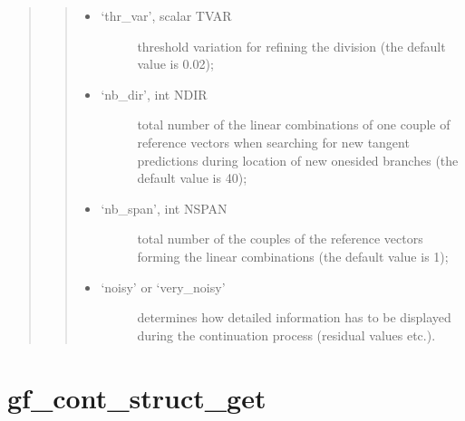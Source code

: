 \documentclass[a4paper,11pt,english]{sphinxmanual}
\begin{document}
\begin{quote}
\begin{quote}
\begin{itemize}
\begin{description}
\end{description}

\item {} \begin{description}
\item[{‘thr\_var’, scalar TVAR}] \leavevmode
threshold variation for refining the division (the default value is
0.02);

\end{description}

\item {} \begin{description}
\item[{‘nb\_dir’, int NDIR}] \leavevmode
total number of the linear combinations of one couple of reference
vectors when searching for new tangent predictions during location of
new one\sphinxhyphen{}sided branches (the default value is 40);

\end{description}

\item {} \begin{description}
\item[{‘nb\_span’, int NSPAN}] \leavevmode
total number of the couples of the reference vectors forming the
linear combinations (the default value is 1);

\end{description}

\item {} \begin{description}
\item[{‘noisy’ or ‘very\_noisy’}] \leavevmode
determines how detailed information has to be displayed during the
continuation process (residual values etc.).

\end{description}

\end{itemize}
\end{quote}
\end{quote}


\section{gf\_cont\_struct\_get}
\label{\detokenize{matlab_octave/cmdref_gf_cont_struct_get:gf-cont-struct-get}}\label{\detokenize{matlab_octave/cmdref_gf_cont_struct_get::doc}}
\end{document}
